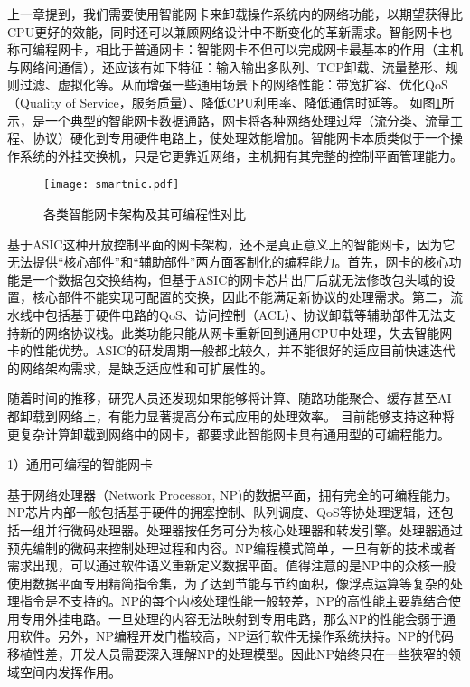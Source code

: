 \label{chap231}

上一章提到，我们需要使用智能网卡来卸载操作系统内的网络功能，以期望获得比CPU更好的效能，同时还可以兼顾网络设计中不断变化的革新需求。智能网卡也称可编程网卡，相比于普通网卡：智能网卡不但可以完成网卡最基本的作用（主机与网络间通信），还应该有如下特征：输入输出多队列、TCP卸载、流量整形、规则过滤、虚拟化等。从而增强一些通用场景下的网络性能：带宽扩容、优化QoS（Quality of Service，服务质量）、降低CPU利用率、降低通信时延等。
如图\ref{fig:smartnic}所示，是一个典型的智能网卡数据通路，网卡将各种网络处理过程（流分类、流量工程、协议）硬化到专用硬件电路上，使处理效能增加。智能网卡本质类似于一个操作系统的外挂交换机，只是它更靠近网络，主机拥有其完整的控制平面管理能力。

\begin{figure}[!ht]
	\centering
	\texttt{[image: smartnic.pdf]}
	\caption{各类智能网卡架构及其可编程性对比} \label{fig:smartnic}
\end{figure}

基于ASIC这种开放控制平面的网卡架构，还不是真正意义上的智能网卡，因为它无法提供“核心部件”和“辅助部件”两方面客制化的编程能力。首先，网卡的核心功能是一个数据包交换结构，但基于ASIC的网卡芯片出厂后就无法修改包头域的设置，核心部件不能实现可配置的交换，因此不能满足新协议的处理需求。第二，流水线中包括基于硬件电路的QoS、访问控制（ACL）、协议卸载等辅助部件无法支持新的网络协议栈。此类功能只能从网卡重新回到通用CPU中处理，失去智能网卡的性能优势。ASIC的研发周期一般都比较久，并不能很好的适应目前快速迭代的网络架构需求，是缺乏适应性和可扩展性的。

随着时间的推移，研究人员还发现如果能够将计算、随路功能聚合、缓存甚至AI都卸载到网络上，有能力显著提高分布式应用的处理效率。%
目前能够支持这种将更复杂计算卸载到网络中的网卡，都要求此智能网卡具有通用型的可编程能力。

1）通用可编程的智能网卡

基于网络处理器（Network Processor, NP)的数据平面，拥有完全的可编程能力。NP芯片内部一般包括基于硬件的拥塞控制、队列调度、QoS等协处理逻辑，还包括一组并行微码处理器。处理器按任务可分为核心处理器和转发引擎。处理器通过预先编制的微码来控制处理过程和内容。NP编程模式简单，一旦有新的技术或者需求出现，可以通过软件语义重新定义数据平面。值得注意的是NP中的众核一般使用数据平面专用精简指令集，为了达到节能与节约面积，像浮点运算等复杂的处理指令是不支持的。NP的每个内核处理性能一般较差，NP的高性能主要靠结合使用专用外挂电路。一旦处理的内容无法映射到专用电路，那么NP的性能会弱于通用软件。另外，NP编程开发门槛较高，NP运行软件无操作系统扶持。NP的代码移植性差，开发人员需要深入理解NP的处理模型。因此NP始终只在一些狭窄的领域空间内发挥作用。



